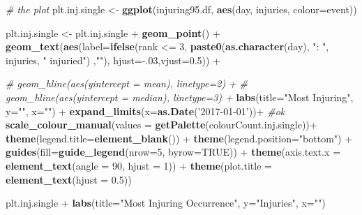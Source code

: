 \documentclass[]{article}
\newenvironment{Shaded}{\begin{snugshade}}{\end{snugshade}}
\newcommand{\KeywordTok}[1]{\textcolor[rgb]{0.13,0.29,0.53}{\textbf{{#1}}}}
\newcommand{\DataTypeTok}[1]{\textcolor[rgb]{0.13,0.29,0.53}{{#1}}}
\newcommand{\DecValTok}[1]{\textcolor[rgb]{0.00,0.00,0.81}{{#1}}}
\newcommand{\FloatTok}[1]{\textcolor[rgb]{0.00,0.00,0.81}{{#1}}}
\newcommand{\StringTok}[1]{\textcolor[rgb]{0.31,0.60,0.02}{{#1}}}
\newcommand{\CommentTok}[1]{\textcolor[rgb]{0.56,0.35,0.01}{\textit{{#1}}}}
\newcommand{\OtherTok}[1]{\textcolor[rgb]{0.56,0.35,0.01}{{#1}}}
\newcommand{\NormalTok}[1]{{#1}}
\begin{document}
\begin{Shaded}
\begin{Highlighting}[]
\CommentTok{# the plot}
\NormalTok{plt.inj.single <-}\StringTok{ }\KeywordTok{ggplot}\NormalTok{(injuring95.df, }\KeywordTok{aes}\NormalTok{(day, injuries, }\DataTypeTok{colour=}\NormalTok{event))}

\NormalTok{plt.inj.single <-}\StringTok{ }\NormalTok{plt.inj.single +}\StringTok{ }\KeywordTok{geom_point}\NormalTok{() +}
\StringTok{        }\KeywordTok{geom_text}\NormalTok{(}\KeywordTok{aes}\NormalTok{(}\DataTypeTok{label=}\KeywordTok{ifelse}\NormalTok{(rank <=}\StringTok{ }\DecValTok{3}\NormalTok{,}
                 \KeywordTok{paste0}\NormalTok{(}\KeywordTok{as.character}\NormalTok{(day), }\StringTok{": "}\NormalTok{, injuries, }\StringTok{" injuried"}\NormalTok{) ,}\StringTok{""}\NormalTok{),}
                \DataTypeTok{hjust=}\NormalTok{-.}\DecValTok{03}\NormalTok{,}\DataTypeTok{vjust=}\FloatTok{0.5}\NormalTok{)) +}

\StringTok{        }\CommentTok{# geom_hline(aes(yintercept = mean), linetype=2) +}
\StringTok{        }\CommentTok{# geom_hline(aes(yintercept = median), linetype=3) +}
\StringTok{        }\KeywordTok{labs}\NormalTok{(}\DataTypeTok{title=}\StringTok{"Most Injuring"}\NormalTok{,}
                    \DataTypeTok{y=}\StringTok{""}\NormalTok{, }\DataTypeTok{x=}\StringTok{""}\NormalTok{) +}
\StringTok{                }
\StringTok{        }\KeywordTok{expand_limits}\NormalTok{(}\DataTypeTok{x=}\KeywordTok{as.Date}\NormalTok{(}\StringTok{'2017-01-01'}\NormalTok{))+}\StringTok{ }\CommentTok{#ok}
\StringTok{        }\KeywordTok{scale_colour_manual}\NormalTok{(}\DataTypeTok{values =} \KeywordTok{getPalette}\NormalTok{(colourCount.inj.single))+}\StringTok{                }
\StringTok{        }\KeywordTok{theme}\NormalTok{(}\DataTypeTok{legend.title=}\KeywordTok{element_blank}\NormalTok{()) +}
\StringTok{        }\KeywordTok{theme}\NormalTok{(}\DataTypeTok{legend.position=}\StringTok{"bottom"}\NormalTok{) +}
\StringTok{        }\KeywordTok{guides}\NormalTok{(}\DataTypeTok{fill=}\KeywordTok{guide_legend}\NormalTok{(}\DataTypeTok{nrow=}\DecValTok{5}\NormalTok{, }\DataTypeTok{byrow=}\OtherTok{TRUE}\NormalTok{)) +}
\StringTok{        }\KeywordTok{theme}\NormalTok{(}\DataTypeTok{axis.text.x =} \KeywordTok{element_text}\NormalTok{(}\DataTypeTok{angle =} \DecValTok{90}\NormalTok{, }\DataTypeTok{hjust =} \DecValTok{1}\NormalTok{)) +}\StringTok{ }
\StringTok{        }\KeywordTok{theme}\NormalTok{(}\DataTypeTok{plot.title =} \KeywordTok{element_text}\NormalTok{(}\DataTypeTok{hjust =} \FloatTok{0.5}\NormalTok{)) }

\NormalTok{plt.inj.single +}\StringTok{ }\KeywordTok{labs}\NormalTok{(}\DataTypeTok{title=}\StringTok{"Most Injuring Occurrence"}\NormalTok{,}
                    \DataTypeTok{y=}\StringTok{"Injuries"}\NormalTok{, }\DataTypeTok{x=}\StringTok{""}\NormalTok{) }
\end{Highlighting}
\end{Shaded}
\end{document}
